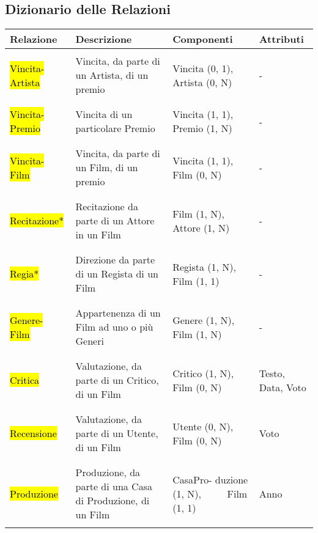 \documentclass{article}
\begin{document}
\subsection{Dizionario delle Relazioni}
\begin{tabular}{|C{2cm}|C{4.5cm}|C{2.4cm}|C{2cm}|}
\hline
 \textbf{Relazione}& \textbf{Descrizione}& \textbf{Componenti}& \textbf{Attributi}\\ 
\hline
\hline
& & & \\
 \hl{Vincita- Artista} & Vincita, da parte di un Artista, di un premio & Vincita (0, 1), Artista (0, N) & -  \\ 
& & & \\
\hline
& & & \\
 \hl{Vincita- Premio} & Vincita di un particolare Premio & Vincita (1, 1), Premio (1, N) & - \\ 
& & & \\
\hline
& & & \\
 \hl{Vincita- Film} & Vincita, da parte di un Film, di un premio &  Vincita (1, 1), Film (0, N) & - \\
& & & \\
\hline
& & & \\
 \hl{Recitazione*} & Recitazione da parte di un Attore in un Film & Film (1, N), Attore (1, N) & - \\ 
& & & \\
\hline
& & & \\
 \hl{Regia*} & Direzione da parte di un Regista di un Film & Regista (1, N), Film (1, 1) & - \\
& & & \\
\hline 
& & & \\
 \hl{Genere- Film} &  Appartenenza di un Film ad uno o più Generi & Genere (1, N), Film (1, N) & - \\
& & & \\
\hline 
& & & \\
 \hl{Critica} & Valutazione, da parte di un Critico, di un Film & Critico (1, N), Film (0, N) & Testo, Data, Voto \\ 
& & & \\
\hline
& & & \\
 \hl{Recensione} & Valutazione, da parte di un Utente, di un Film & Utente (0, N), Film (0, N) & Voto \\
& & & \\
\hline 
& & & \\
 \hl{Produzione} & Produzione, da parte di una Casa di Produzione, di un Film & CasaPro- duzione (1, N), \,\,\,\,\,\,\,\,\,\,\,\, Film (1, 1) & Anno \\
& & & \\
\hline 
\end{tabular}
\end{document}

